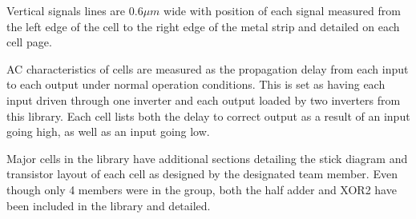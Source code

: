 Vertical signals lines are $0.6\mu m$ wide with position of each signal measured from the left edge of the cell to the right edge of the metal strip and detailed on each cell page. 

AC characteristics of cells are measured as the propagation delay from each input to each output under normal operation conditions. 
This is set as having each input driven through one inverter and each output loaded by two inverters from this library. 
Each cell lists both the delay to correct output as a result of an input going high, as well as an input going low. 

Major cells in the library have additional sections detailing the stick diagram and transistor layout of each cell as designed by the designated team member. 
Even though only 4 members were in the group, both the half adder and XOR2 have been included in the library and detailed. 
